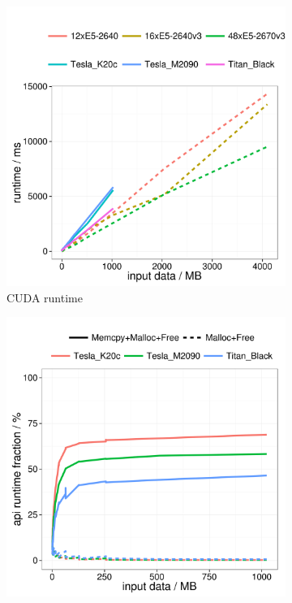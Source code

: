 \begin{figure}[h]
  \centering
  \hfill
  \begin{subfigure}[b]{0.45\textwidth}
    \includegraphics[width=\textwidth]{plots/synced_gpu_runtime}
    \caption{CUDA runtime}
    \label{fig:single_fft_runtime}
  \end{subfigure}%
  \hfill
  \begin{subfigure}[b]{0.45\textwidth}
    \includegraphics[width=\textwidth]{plots/synced_gpu_api_fraction}

\end{subfigure}
\end{figure}
